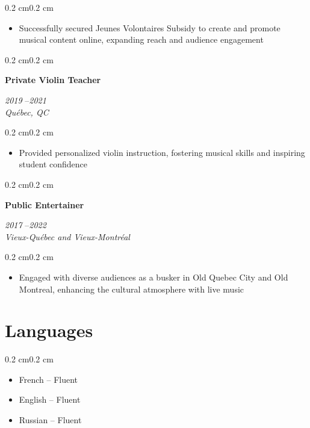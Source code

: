 \documentclass[10pt, letterpaper]{article}
\newenvironment{highlights}{%
    \begin{itemize}[
        topsep=0.10 cm,%
        parsep=0.10 cm,%
        partopsep=0pt,%
        itemsep=0pt,%
        leftmargin=0.4 cm + 10pt%
    ]
}{%
    \end{itemize}%
}
\newenvironment{onecolentry}{%
    \begin{adjustwidth}{0.2 cm}{0.2 cm}%
}{%
    \end{adjustwidth}%
}
\newenvironment{twocolentry}[1]{%
    \begin{onecolentry}%
    \def\twocolentryarg{#1}%
    \noindent
    \begin{minipage}[t]{0.68\textwidth} %
}{%
    \end{minipage}\hfill%
    \begin{minipage}[t]{0.30\textwidth} %
      \raggedleft\twocolentryarg
    \end{minipage}%
    \vspace{0.2cm}%
    \end{onecolentry}%
}
\begin{document}
\vspace{0.10 cm}
\begin{onecolentry}
    \begin{highlights}
        \item Successfully secured Jeunes Volontaires Subsidy to create and promote musical content online, expanding reach and audience engagement
    \end{highlights}
\end{onecolentry}
\vspace{0.2 cm}
\begin{twocolentry}{%
\textit{2019 }--\textit{2021} \\[0.1cm]
\textit{Québec, QC}%
}
    \textbf{Private Violin Teacher }\\
    \textit{ }
\end{twocolentry}
\vspace{0.10 cm}
\begin{onecolentry}
    \begin{highlights}
        \item Provided personalized violin instruction, fostering musical skills and inspiring student confidence
    \end{highlights}
\end{onecolentry}
\vspace{0.2 cm}
\begin{twocolentry}{%
\textit{2017 }--\textit{2022} \\[0.1cm]
\textit{Vieux-Québec and Vieux-Montréal}%
}
    \textbf{Public Entertainer }\\
    \textit{ }
\end{twocolentry}
\vspace{0.10 cm}
\begin{onecolentry}
    \begin{highlights}
        \item Engaged with diverse audiences as a busker in Old Quebec City and Old Montreal, enhancing the cultural atmosphere with live music
    \end{highlights}
\end{onecolentry}
\vspace{0.2 cm}




\section{Languages}
\begin{onecolentry}
    \begin{highlights}
        \item French -- Fluent
        \item English -- Fluent
        \item Russian -- Fluent
    \end{highlights}
\end{onecolentry}
\end{document}
